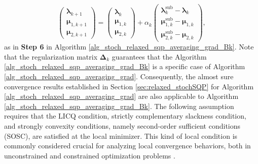 \documentclass[aos]{imsart}
\numberwithin{equation}{section}
\theoremstyle{plain}
\begin{document}
\begin{equation}
\label{update_dual}
    \left( \begin{array}{c}
         \bm{\lambda}_{k+1} \\
         \bm{\mu}_{1,k+1} \\
         \bm{\mu}_{2,k+1}
    \end{array} \right) = \left( \begin{array}{c}
         \bm{\lambda}_{k} \\
         \bm{\mu}_{1,k} \\
         \bm{\mu}_{2,k}
    \end{array} \right) + \alpha_k \left( \begin{array}{c}
         \bm{\lambda}_k^{\text{sub}} - \bm{\lambda}_{k} \\
         \bm{\mu}_{1,k}^{\text{sub}} - \bm{\mu}_{1,k} \\
         \bm{\mu}_{2,k}^{\text{sub}} - \bm{\mu}_{2,k}
    \end{array} \right),
\end{equation}
as in \textbf{Step 6} in Algorithm \ref{alg_stoch_relaxed_sqp_averaging_grad_Bk}.
Note that the regularization matrix $\bm{\Delta}_k$ guarantees that the Algorithm \ref{alg_stoch_relaxed_sqp_averaging_grad_Bk} is a specific case of Algorithm \ref{alg_stoch_relaxed_sqp_averaging_grad}. 
Consequently, the almost sure convergence results established in Section \ref{sec:relaxed_stochSQP} for Algorithm \ref{alg_stoch_relaxed_sqp_averaging_grad} are also applicable to Algorithm \ref{alg_stoch_relaxed_sqp_averaging_grad_Bk}. 
The following assumption requires that the LICQ condition, strictly complementary slackness condition, and strongly convexity conditions, namely second-order sufficient conditions (SOSC), are satisfied at the local minimizer. This kind of local condition is commonly considered crucial for analyzing local convergence behaviors, both in unconstrained and constrained optimization problems \cite{jorge2006numerical}.
\end{document}

